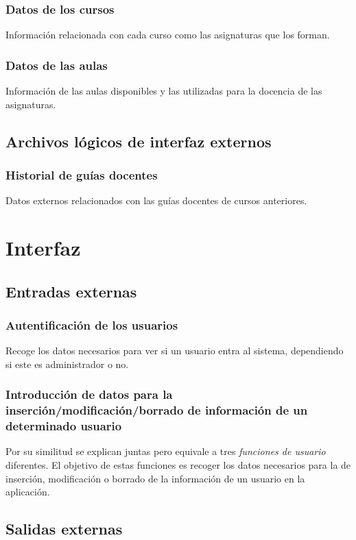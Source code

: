 \documentclass[11pt,a4paper,spanish,twoside]{book}
\begin{document}
\subsubsection{Datos de los cursos}
Información relacionada con cada curso como las asignaturas que los forman.

\subsubsection{Datos de las aulas}
Información de las aulas disponibles y las utilizadas para la docencia de las asignaturas.

\subsection{Archivos lógicos de interfaz externos}
\subsubsection{Historial de guías docentes}
Datos externos relacionados con las guías docentes de cursos anteriores. 

\section{Interfaz}
\subsection{Entradas externas}
\subsubsection{Autentificación de los usuarios}
Recoge los datos necesarios para ver si un usuario entra al sistema,
dependiendo si este es administrador o no.

\subsubsection{Introducción de datos para la inserción/modificación/borrado 
de información de un determinado usuario}
Por su similitud se explican juntas pero equivale a tres \emph{funciones de
usuario} diferentes. El objetivo de estas funciones es recoger los datos
necesarios para la de inserción, modificación o borrado de la información de
un usuario en la aplicación.

\subsection{Salidas externas}
\end{document}
